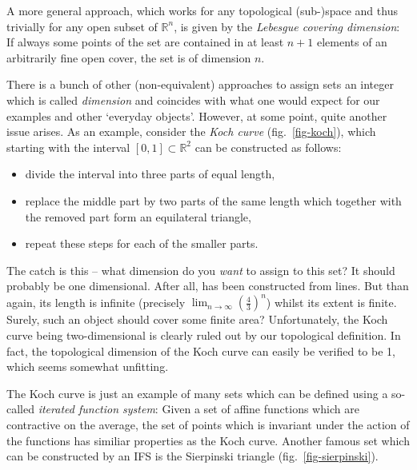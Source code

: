 \documentclass[twocolumn,10pt]{scrartcl}
\begin{document}
            A more general approach, which works for any topological (sub-)space and thus trivially for any open subset
            of $\mathbb{R}^n$, is given by the \emph{Lebesgue covering dimension}: If always some points of the set are
            contained in at least $n+1$ elements of an arbitrarily fine open cover, the set is of dimension $n$.

            There is a bunch of other (non-equivalent) approaches to assign sets an integer which is called
            \emph{dimension} and coincides with what one would expect for our examples and other `everyday objects'.
            However, at some point, quite another issue arises. As an example, consider the \emph{Koch curve}
            (fig.~\ref{fig-koch}), which starting with the interval $\left[0,1\right]\subset\mathbb{R}^2$ can be
            constructed as follows:

            \begin{itemize}
                \item divide the interval into three parts of equal length,
                \item replace the middle part by two parts of the same length which together with the removed part
                    form an equilateral triangle,
                \item repeat these steps for each of the smaller parts.
            \end{itemize}

            The catch is this -- what dimension do you \emph{want} to assign to this set? It should probably be
            one dimensional. After all, has been constructed from lines. But than again, its length is infinite
            (precisely $\lim_{n\rightarrow\infty}\left(\frac{4}{3}\right)^n$) whilst its extent is finite. Surely, such
            an object should cover some finite area? Unfortunately, the Koch curve being two-dimensional is clearly
            ruled out by our topological definition. In fact, the topological dimension of the Koch curve can easily be
            verified to be 1, which seems somewhat unfitting.

            The Koch curve is just an example of many sets which can be defined using a so-called
            \emph{iterated function system}: Given a set of affine
            functions which are contractive on the average, the set of points which is invariant under the action
            of the functions has similiar properties as the Koch curve. Another famous set which can be constructed by
            an IFS is the Sierpinski triangle (fig.~\ref{fig-sierpinski}).
\end{document}
